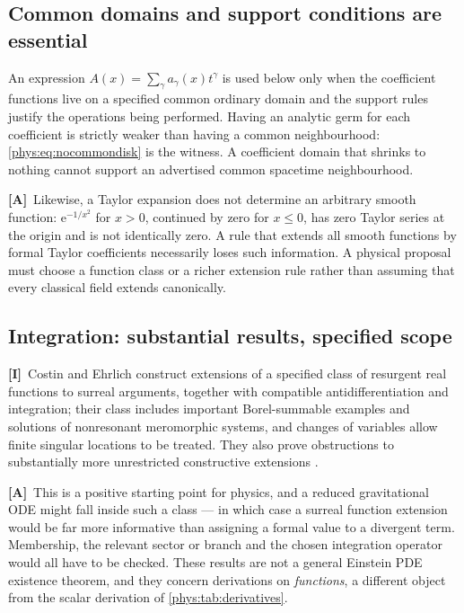 \documentclass[11pt,letterpaper]{article}
\numberwithin{equation}{section}
\theoremstyle{definition}
\theoremstyle{remark}
\newcommand{\ee}{\mathrm e}
\newcommand{\TA}{\textcolor{TierA}{\textsf{\bfseries[A]}}}
\newcommand{\TI}{\textcolor{TierI}{\textsf{\bfseries[I]}}}
\begin{document}
\subsection{Common domains and support conditions are essential}
\label{phys:sub:commondomain}

An expression $A(x)=\sum_{\gamma}a_{\gamma}(x)t^{\gamma}$ is used below only
when the coefficient functions live on a specified common ordinary domain and
the support rules justify the operations being performed. Having an analytic
germ for each coefficient is strictly weaker than having a common
neighbourhood: \eqref{phys:eq:nocommondisk} is the witness. A coefficient
domain that shrinks to nothing cannot support an advertised common spacetime
neighbourhood.

\TA\ Likewise, a Taylor expansion does not determine an arbitrary smooth
function: $\ee^{-1/x^{2}}$ for $x>0$, continued by zero for $x\le0$, has zero
Taylor series at the origin and is not identically zero. A rule that extends
all smooth functions by formal Taylor coefficients necessarily loses such
information. A physical proposal must choose a function class or a richer
extension rule rather than assuming that every classical field extends
canonically.

\subsection{Integration: substantial results, specified scope}
\label{phys:sub:integration}

\TI\ Costin and Ehrlich construct extensions of a specified class of resurgent
real functions to surreal arguments, together with compatible
antidifferentiation and integration; their class includes important
Borel-summable examples and solutions of nonresonant meromorphic systems, and
changes of variables allow finite singular locations to be treated. They also
prove obstructions to substantially more unrestricted constructive extensions
\cite{phys:CE}.

\TA\ This is a positive starting point for physics, and a reduced
gravitational ODE might fall inside such a class --- in which case a surreal
function extension would be far more informative than assigning a formal value
to a divergent term. Membership, the relevant sector or branch and the chosen
integration operator would all have to be checked. These results are not a
general Einstein PDE existence theorem, and they concern derivations on
\emph{functions}, a different object from the scalar derivation of
\cref{phys:tab:derivatives}.
\end{document}
